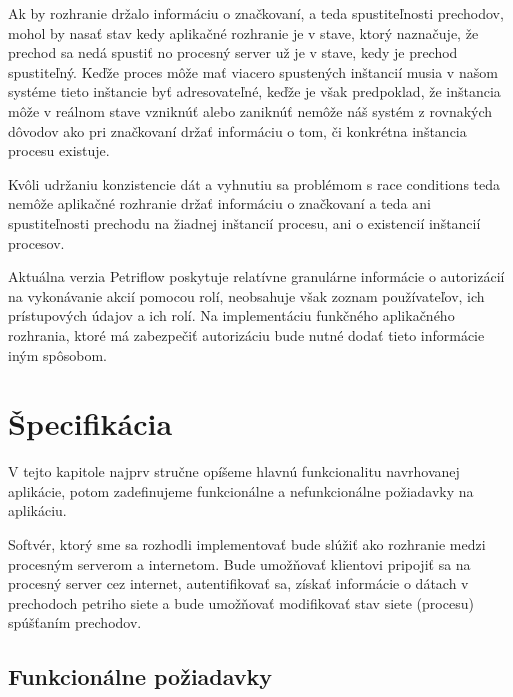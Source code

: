 Ak by rozhranie držalo informáciu o značkovaní, a teda spustiteľnosti prechodov, mohol by nasať stav kedy aplikačné rozhranie je v stave, ktorý naznačuje, že prechod sa nedá spustiť no procesný server už je v stave, kedy je prechod spustiteľný. Keďže proces môže mať viacero spustených inštancií musia v našom systéme tieto inštancie byť adresovateľné, keďže je však predpoklad, že inštancia môže v reálnom stave vzniknúť alebo zaniknúť nemôže náš systém z rovnakých dôvodov ako pri značkovaní držať informáciu o tom, či konkrétna inštancia procesu existuje. 

Kvôli udržaniu konzistencie dát a vyhnutiu sa problémom s race conditions teda nemôže aplikačné rozhranie držať informáciu o značkovaní a teda ani spustiteľnosti prechodu na žiadnej inštancií procesu, ani o existencií inštancií procesov.

Aktuálna verzia Petriflow poskytuje relatívne granulárne informácie o autorizácií na vykonávanie akcií pomocou rolí, neobsahuje však zoznam používateľov, ich prístupových údajov a ich rolí. Na implementáciu funkčného aplikačného rozhrania, ktoré má zabezpečiť autorizáciu bude nutné dodať tieto informácie iným spôsobom.


\section{Špecifikácia}

V tejto kapitole najprv stručne opíšeme hlavnú funkcionalitu navrhovanej aplikácie, potom zadefinujeme funkcionálne a nefunkcionálne požiadavky na aplikáciu.

Softvér, ktorý sme sa rozhodli implementovať bude slúžiť ako rozhranie medzi procesným serverom a internetom. Bude umožňovať klientovi pripojiť sa na procesný server cez internet, autentifikovať sa, získať informácie o dátach v prechodoch petriho siete a bude umožňovať modifikovať stav siete (procesu) spúšťaním prechodov.

\subsection{Funkcionálne požiadavky}

